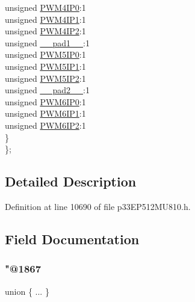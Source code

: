 \begin{DoxyCompactItemize}
\begin{tabbing}
\>\>unsigned \hyperlink{structtag_i_p_c24_b_i_t_s_a5ef44fd9a80c04adc2d7a6371d1bdaab}{PWM4IP0}:1\\
\>\>unsigned \hyperlink{structtag_i_p_c24_b_i_t_s_a433128616e881df612429e8ba0342ddb}{PWM4IP1}:1\\
\>\>unsigned \hyperlink{structtag_i_p_c24_b_i_t_s_a212fd7fec152354dadfbe406184dd1fb}{PWM4IP2}:1\\
\>\>unsigned \hyperlink{structtag_i_p_c24_b_i_t_s_acaf2d0924a107ec6e8d2e31febaf66f9}{\_\_pad1\_\_}:1\\
\>\>unsigned \hyperlink{structtag_i_p_c24_b_i_t_s_a8503d7a3847594dec66fad9d5b48915e}{PWM5IP0}:1\\
\>\>unsigned \hyperlink{structtag_i_p_c24_b_i_t_s_a7e175d249c826f6686a115d04b7ba991}{PWM5IP1}:1\\
\>\>unsigned \hyperlink{structtag_i_p_c24_b_i_t_s_a60236a3e8be7a701c17cd2e9f6925b66}{PWM5IP2}:1\\
\>\>unsigned \hyperlink{structtag_i_p_c24_b_i_t_s_a4d97cc5f7d51d22fc2bf3eab35c9cb7f}{\_\_pad2\_\_}:1\\
\>\>unsigned \hyperlink{structtag_i_p_c24_b_i_t_s_a4f74a04a2634b0642c13ef21b9c2caed}{PWM6IP0}:1\\
\>\>unsigned \hyperlink{structtag_i_p_c24_b_i_t_s_a158ba22d48c6667144a870714fbbc154}{PWM6IP1}:1\\
\>\>unsigned \hyperlink{structtag_i_p_c24_b_i_t_s_a8e75544f261db9c2b8c7f3e78db3a8e5}{PWM6IP2}:1\\
\>\} \\
\}; \\

\end{tabbing}\end{DoxyCompactItemize}


\subsection{Detailed Description}


Definition at line 10690 of file p33\+E\+P512\+M\+U810.\+h.



\subsection{Field Documentation}
\mbox{\label{structtag_i_p_c24_b_i_t_s_a43faee8265f594d5a4c4b081437cf643}} 
\subsubsection{\texorpdfstring{"@1867}{@1867}}
{\footnotesize\ttfamily union \{ ... \} }

